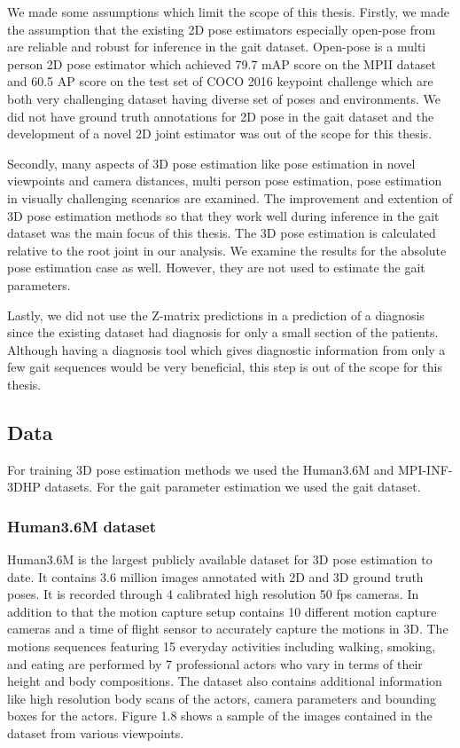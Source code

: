 We made some assumptions which limit the scope of this thesis. Firstly, we made the assumption that the existing 2D pose estimators especially open-pose from \parencite{cao2016realtime} are reliable and robust for inference in the gait dataset. Open-pose is a multi person 2D pose estimator which achieved 79.7 mAP score on the MPII dataset and 60.5 AP score on the test set of COCO 2016 keypoint challenge which are both very challenging dataset having diverse set of poses and environments. We did not have ground truth annotations for 2D pose in the gait dataset and the development of a novel 2D joint estimator was out of the scope for this thesis.

Secondly, many aspects of 3D pose estimation like pose estimation in novel viewpoints and camera distances, multi person pose estimation, pose estimation in visually challenging scenarios are examined. The improvement and extention of 3D pose estimation methods so that they work well during inference in the gait dataset was the main focus of this thesis. The 3D pose estimation is calculated relative to the root joint in our analysis. We examine the results for the absolute pose estimation case as well. However, they are not used to estimate the gait parameters.

Lastly, we did not use the Z-matrix predictions in a prediction of a diagnosis since the existing dataset had diagnosis for only a small section of the patients. Although having a diagnosis tool which gives diagnostic information from only a few gait sequences would be very beneficial, this step is out of the scope for this thesis.

\subsection{Data}

For training 3D pose estimation methods we used the Human3.6M \parencite{ionescu2014human3} and MPI-INF-3DHP \parencite{mehta2017monocular} datasets. For the gait parameter estimation we used the gait dataset.

\subsubsection{Human3.6M dataset}

Human3.6M is the largest publicly available dataset for 3D pose estimation to date. It contains 3.6 million images annotated with 2D and 3D ground truth poses. It is recorded through 4 calibrated high resolution 50 fps cameras. In addition to that the motion capture setup contains 10 different motion capture cameras and a time of flight sensor to accurately capture the motions in 3D. The motions sequences featuring 15 everyday activities including walking, smoking, and eating are performed by 7 professional actors who vary in terms of their height and body compositions. The dataset also contains additional information like high resolution body scans of the actors, camera parameters and bounding boxes for the actors. Figure 1.8 shows a sample of the images contained in the dataset from various viewpoints.

